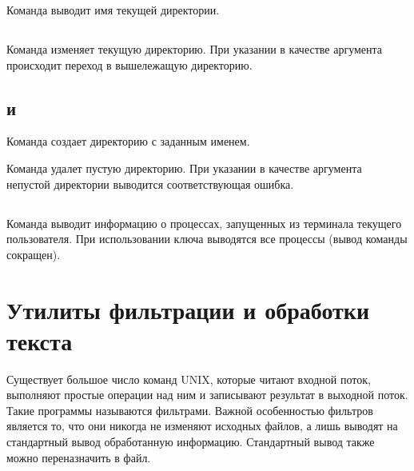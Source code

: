 Команда  выводит имя текущей директории.


\vspace{-1em}
\subsection{}

Команда  изменяет текущую директорию. При указании в качестве аргумента  происходит переход в вышележащую директорию.


\vspace{-1em}
\subsection{ и }

Команда  создает директорию с заданным именем.


Команда  удалет пустую директорию. При указании в качестве аргумента непустой директории выводится соответствующая ошибка.


\vspace{-1em}
\subsection{}

Команда  выводит информацию о процессах, запущенных из терминала текущего пользователя. При использовании ключа  выводятся все процессы (вывод команды  сокращен).


\section{Утилиты фильтрации и обработки текста}

Существует большое число команд UNIX, которые читают входной поток, выполняют простые операции над ним и записывают результат в выходной поток. Такие программы называются фильтрами. Важной особенностью фильтров является то, что они никогда не изменяют исходных файлов, а лишь выводят на стандартный вывод обработанную информацию. Стандартный вывод также можно переназначить в файл.

